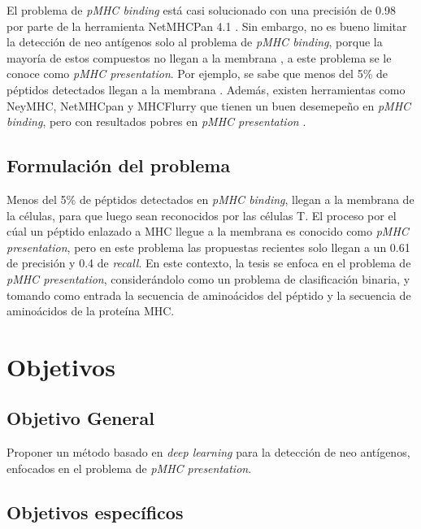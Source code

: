 El problema de \textit{pMHC binding} está casi solucionado con una precisión de 0.98 por parte de la herramienta NetMHCPan 4.1 \citep{reynisson2020netmhcpan}. Sin embargo, no es bueno limitar la detección de neo antígenos solo al problema de \textit{pMHC binding}, porque la mayoría de estos compuestos no llegan a la membrana \citep{mill2022neoms}, a este problema se le conoce como \textit{pMHC presentation}. Por ejemplo, se sabe que menos del 5\% de péptidos detectados llegan a la membrana \citep{de2020neoantigen, mill2022neoms, bulik2019deep, bassani2015mass, yadav2014predicting}. Además, existen herramientas como NeyMHC, NetMHCpan y MHCFlurry que tienen un buen desemepeño en \textit{pMHC binding}, pero con resultados pobres en  \textit{pMHC presentation} \citep{bulik2019deep}.



\subsection{Formulación del problema}

Menos del 5\% de péptidos detectados en \textit{pMHC binding}, llegan a la membrana de la células, para que luego sean reconocidos por las células T.  El proceso por el cúal un péptido enlazado a MHC llegue a la membrana es conocido como  \textit{pMHC presentation}, pero en este problema las propuestas recientes solo llegan a un 0.61 de precisión y 0.4 de \textit{recall}. En este contexto, la tesis se enfoca en el problema de \textit{pMHC presentation}, considerándolo como un problema de clasificación binaria, y tomando como entrada la secuencia de aminoácidos del péptido y la secuencia de aminoácidos de la proteína MHC. 



\section{Objetivos}
\label{sec:objetivos}

\subsection{Objetivo General}

Proponer un método basado en \textit{deep learning} para la detección de neo antígenos, enfocados en el problema de \textit{pMHC presentation}. 

\subsection{Objetivos específicos}

